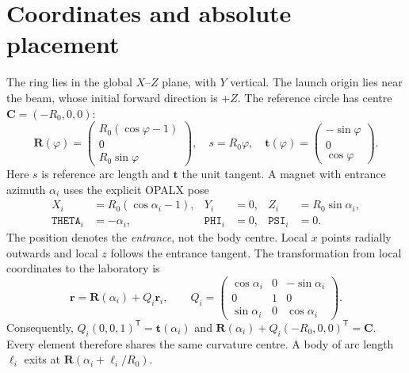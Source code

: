 \documentclass[11pt,a4paper]{article}
\newcommand{\vect}[1]{\boldsymbol{#1}}
\begin{document}
\section{Coordinates and absolute placement}
The ring lies in the global $X$--$Z$ plane, with $Y$ vertical. The launch origin
lies near the beam, whose initial forward direction is $+Z$. The reference
circle has centre $\vect C=(-R_0,0,0)$:
\begin{equation}
 \vect R(\varphi)=\begin{pmatrix}R_0(\cos\varphi-1)\\0\\R_0\sin\varphi\end{pmatrix},
 \quad s=R_0\varphi,\quad
 \vect t(\varphi)=\begin{pmatrix}-\sin\varphi\\0\\\cos\varphi\end{pmatrix}.
 \label{eq:circle}
\end{equation}
Here $s$ is reference arc length and $\vect t$ the unit tangent. A magnet with
entrance azimuth $\alpha_i$ uses the explicit OPALX pose
\begin{equation}
 \boxed{\begin{aligned}
 X_i&=R_0(\cos\alpha_i-1),&Y_i&=0,&Z_i&=R_0\sin\alpha_i,\\
 \texttt{THETA}_i&=-\alpha_i,&\texttt{PHI}_i&=0,&\texttt{PSI}_i&=0.
 \end{aligned}}
 \label{eq:pose}
\end{equation}
The position denotes the \emph{entrance}, not the body centre. Local $x$ points
radially outwards and local $z$ follows the entrance tangent. The transformation
from local coordinates to the laboratory is
\begin{equation}
 \vect r=\vect R(\alpha_i)+Q_i\vect r_i,\qquad
 Q_i=\begin{pmatrix}\cos\alpha_i&0&-\sin\alpha_i\\0&1&0\\
 \sin\alpha_i&0&\cos\alpha_i\end{pmatrix}.
 \label{eq:transform}
\end{equation}
Consequently, $Q_i(0,0,1)^{\mathsf T}=\vect t(\alpha_i)$ and
$\vect R(\alpha_i)+Q_i(-R_0,0,0)^{\mathsf T}=\vect C$.
Every element therefore shares the same curvature centre. A body of arc length
$\ell_i$ exits at $\vect R(\alpha_i+\ell_i/R_0)$.
\end{document}
